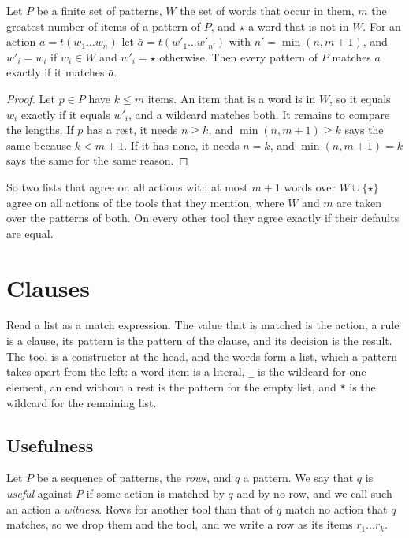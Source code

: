 \documentclass[acmsmall,nonacm,screen]{acmart}
\newcommand{\any}{\textup{\texttt{\_}}}
\newcommand{\rest}{\textup{\texttt{*}}}
\newcommand{\fresh}{\star}
\begin{document}
\begin{lemma}\label{lem:finite}
Let $P$ be a finite set of patterns, $W$ the set of words that occur in them, $m$ the
greatest number of items of a pattern of $P$, and $\fresh$ a word that is not in $W$. For an
action $a = t(w_1 \ldots w_n)$ let $\bar{a} = t(w'_1 \ldots w'_{n'})$ with $n' = \min(n, m +
1)$, and $w'_i = w_i$ if $w_i \in W$ and $w'_i = \fresh$ otherwise. Then every pattern of $P$
matches $a$ exactly if it matches $\bar{a}$.
\end{lemma}

\begin{proof}
Let $p \in P$ have $k \le m$ items. An item that is a word is in $W$, so it equals $w_i$
exactly if it equals $w'_i$, and a wildcard matches both. It remains to compare the lengths.
If $p$ has a rest, it needs $n \ge k$, and $\min(n, m + 1) \ge k$ says the same because $k <
m + 1$. If it has none, it needs $n = k$, and $\min(n, m + 1) = k$ says the same for the same
reason.
\end{proof}

So two lists that agree on all actions with at most $m + 1$ words over $W \cup \{\fresh\}$
agree on all actions of the tools that they mention, where $W$ and $m$ are taken over the
patterns of both. On every other tool they agree exactly if their defaults are equal.

\section{Clauses}\label{sec:clauses}

Read a list as a match expression. The value that is matched is the action, a rule is a
clause, its pattern is the pattern of the clause, and its decision is the result. The tool is
a constructor at the head, and the words form a list, which a pattern takes apart from the
left: a word item is a literal, \any{} is the wildcard for one element, an end without a rest
is the pattern for the empty list, and \rest{} is the wildcard for the remaining list.

\subsection{Usefulness}

Let $P$ be a sequence of patterns, the \emph{rows}, and $q$ a pattern. We say that $q$ is
\emph{useful} against $P$ if some action is matched by $q$ and by no row, and we call such an
action a \emph{witness}. Rows for another tool than that of $q$ match no action that $q$
matches, so we drop them and the tool, and we write a row as its items $r_1 \ldots r_k$.
\end{document}
